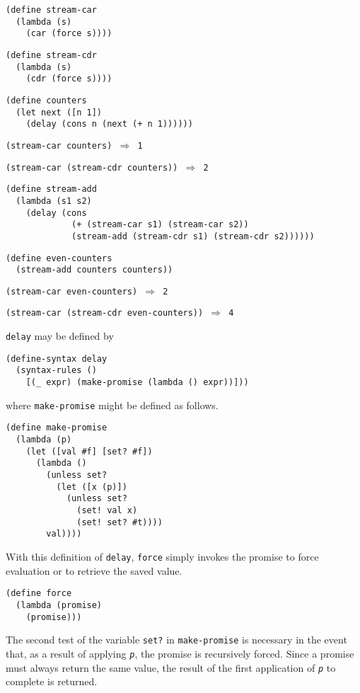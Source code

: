 \begin{alltt}
(define stream-car
  (lambda (s)
    (car (force s))))

(define stream-cdr
  (lambda (s)
    (cdr (force s))))

(define counters
  (let next ([n 1])
    (delay (cons n (next (+ n 1))))))

(stream-car counters) \(\Rightarrow\) 1

(stream-car (stream-cdr counters)) \(\Rightarrow\) 2

(define stream-add
  (lambda (s1 s2)
    (delay (cons
             (+ (stream-car s1) (stream-car s2))
             (stream-add (stream-cdr s1) (stream-cdr s2))))))

(define even-counters
  (stream-add counters counters))

(stream-car even-counters) \(\Rightarrow\) 2

(stream-car (stream-cdr even-counters)) \(\Rightarrow\) 4
\end{alltt}

\texttt{delay} may be defined by

\begin{alltt}
(define-syntax delay
  (syntax-rules ()
    [(\_{} expr) (make-promise (lambda () expr))]))
\end{alltt}


where \label{control_s67}\texttt{make-promise} might be defined
as follows.


\begin{alltt}
(define make-promise
  (lambda (p)
    (let ([val \#{}f] [set? \#{}f])
      (lambda ()
        (unless set?
          (let ([x (p)])
            (unless set?
              (set! val x)
              (set! set? \#{}t))))
        val))))
\end{alltt}


With this definition of \texttt{delay}, \texttt{force} simply invokes the promise
to force evaluation or to retrieve the saved value.


\begin{alltt}
(define force
  (lambda (promise)
    (promise)))
\end{alltt}


The second test of the variable \texttt{set?} in \texttt{make-promise} is necessary
in the event that, as a result of applying \texttt{\textit{p}}, the
promise is recursively forced.
Since a promise must always return the same value, the
result of the first application of \texttt{\textit{p}} to complete is
returned.


